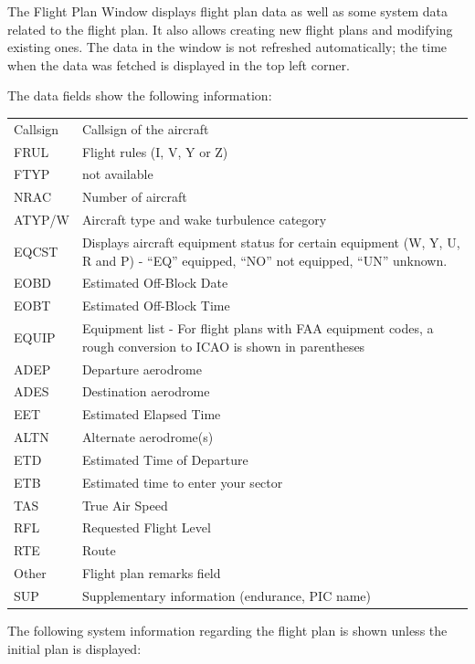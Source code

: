 \documentclass[11pt,a4paper]{memoir}
\begin{document}
The Flight Plan Window displays flight plan data as well as some system data related to the flight plan. It also allows creating new flight plans and modifying existing ones. The data in the window is not refreshed automatically; the time when the data was fetched is displayed in the top left corner.

The data fields show the following information:

\begin{tabular}{l l}
    Callsign    & Callsign of the aircraft\\
    FRUL        & Flight rules (I, V, Y or Z)\\
    FTYP        & not available\\
    NRAC        & Number of aircraft\\
    ATYP/W      & Aircraft type and wake turbulence category\\
    EQCST       & Displays aircraft equipment status for certain equipment (W, Y, U, R and P) - “EQ” equipped, “NO” not equipped, “UN” unknown.\\
    EOBD        & Estimated Off-Block Date\\
    EOBT        & Estimated Off-Block Time\\
    EQUIP       & Equipment list - For flight plans with FAA equipment codes, a rough conversion to ICAO is shown in parentheses\\
    ADEP        & Departure aerodrome\\
    ADES        & Destination aerodrome\\
    EET         & Estimated Elapsed Time\\
    ALTN        & Alternate aerodrome(s)\\
    ETD         & Estimated Time of Departure\\
    ETB         & Estimated time to enter your sector\\
    TAS         & True Air Speed\\
    RFL         & Requested Flight Level\\
    RTE         & Route\\
    Other       & Flight plan remarks field\\
    SUP         & Supplementary information (endurance, PIC name)\\
\end{tabular}

The following system information regarding the flight plan is shown unless the initial plan is displayed:
\end{document}
